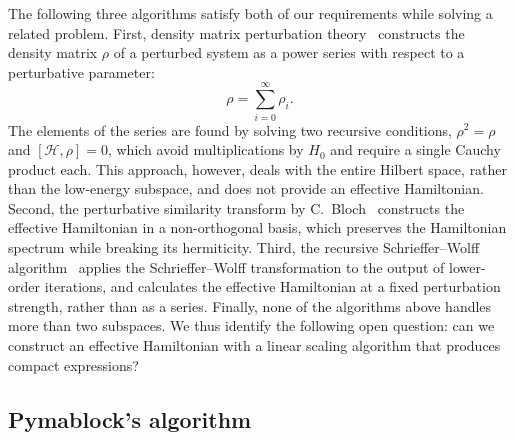 The following three algorithms satisfy both of our requirements while solving a related problem.
First, density matrix perturbation theory~\cite{McWeeny_1962,McWeeny_1968,Truflandier_2020} constructs the density
matrix $\mathcal{\rho}$ of a perturbed system as a power series with respect to a perturbative parameter:
%
\begin{equation}
  \mathcal{\rho} = \sum_{i=0}^{\infty} \rho_i.
\end{equation}
%
The elements of the series are found by solving two recursive conditions, $\mathcal{\rho}^2 = \mathcal{\rho}$ and $[\mathcal{H}, \mathcal{\rho}]=0$, which avoid multiplications by $H_0$ and require a single Cauchy product each.
This approach, however, deals with the entire Hilbert space, rather than the low-energy subspace, and does not provide an effective Hamiltonian.
Second, the perturbative similarity transform by C.~Bloch~\cite{Bloch_1958,Bravyi_2011} constructs the effective Hamiltonian in a non-orthogonal basis, which preserves the Hamiltonian spectrum while breaking its hermiticity.
Third, the recursive Schrieffer--Wolff algorithm~\cite{Li_2022} applies the Schrieffer--Wolff transformation to the output of lower-order iterations, and calculates the effective Hamiltonian at a fixed perturbation strength, rather
than as a series.
Finally, none of the algorithms above handles more than two subspaces.
We thus identify the following open question: can we construct an effective Hamiltonian with a linear scaling algorithm that produces compact expressions?

\subsection{Pymablock's algorithm}
\label{sec:pymablock_algorithm}

